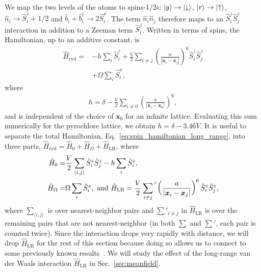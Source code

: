 \documentclass[twocolumn,superscriptaddress,amsmath,amssymb,aps,prx,nofootinbib]{revtex4-2}
\newcommand{\sumlr}[1]{\sum^{}_{#1} {\vphantom{\sum}}'}
\begin{document}
We map the two levels of the atoms to spins-1/2s: $\ket{g} \rightarrow \ket{\downarrow}$, $\ket{r} \rightarrow \ket{\uparrow}$, $\hat{n}_i \rightarrow \hat{S}_i^z +1/2$  and $\hat{b}_i + \hat{b}_i^\dagger \rightarrow 2 \hat{S}_i^x$. The term $\hat{n}_i \hat{n}_j$ therefore maps to an $ \hat{S}_i^z \hat{S}_j^z$ interaction in addition to a Zeeman term $\hat{S}_i^z$. Written in terms of spins, the Hamiltonian, up to an additive constant, is
\begin{equation} \label{eq:spin_hamiltonian_long_range}
\begin{aligned}
\hat{H}_{\text{ryd}} = &- h \sum_i \hat{S}_i^z + \frac{V}{2} \sum_{i \neq j} \left( \frac{a}{|\bm{x}_i - \bm{x}_j| }\right)^6 \hat{S}_i^z \hat{S}_j^z  \\
& + \Omega \sum_i \hat{S}_i^x ,
\end{aligned}
\end{equation}
where
\begin{equation} \label{eq:h_def}
\begin{aligned}
  h = \delta -\frac{V}{2}   \sum^{}_{i \neq 0}  \left( \frac{a}{|\bm{x}_i - \bm{x}_0|} \right)^6, 
  \end{aligned}
\end{equation}
and is independent of the choice of $\bm{x}_0$ for an infinite lattice.
Evaluating this sum numerically for the pyrochlore lattice, we obtain  $h = \delta - 3.46 V$. It is useful to separate the total Hamiltonian, Eq.~\eqref{eq:spin_hamiltonian_long_range}, into three parts, $\hat{H}_{\text{ryd}}=\hat{H}_0 + \hat{H}_{\Omega}+\hat{H}_{\text{LR}}$, where
\begin{equation}\label{eq:hamsplit}
    \begin{aligned}
      \hat{H}_0=& \frac{V}{2}\sum_{\langle i,j \rangle }\hat{S}_i^z \hat{S}_j^z - h \sum_i \hat{S}_i^z,\\
        \hat{H}_{\Omega}=&\Omega \sum_i \hat{S}_i^x, \text{ and }
        \hat{H}_{\text{LR}}= \frac{V}{2} \sumlr{i \neq j} \left( \frac{a}{|\bm{x}_i - \bm{x}_j| }\right)^6 \hat{S}_i^z \hat{S}_j^z,  
    \end{aligned}
\end{equation}
where $\sum_{\langle i,j \rangle }$ is over nearest-neighbor pairs and $\sum'_{i \neq j}$ in $\hat{H}_{\text{LR}}$ is over the remaining pairs that are not nearest-neighbor (in both $\sum$ and $\sum'$, each pair is counted twice). 
Since the interaction drops very rapidly with distance, we will drop $\hat{H}_{\text{LR}}$ for the rest of this section because doing so allows us to connect to some previously known results~\cite{hermele2004,shannon2012,Sikora2009}. We will study the effect of the long-range van der Waals interaction $\hat{H}_{\text{LR}}$ in Sec.~\ref{sec:meanfield}. 
\end{document}
